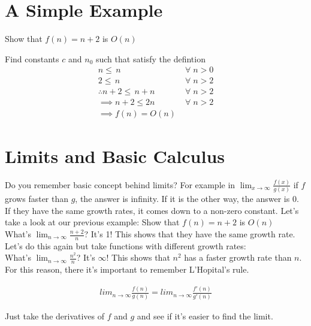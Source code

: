 \documentclass[11pt]{book}
\begin{document}
	\section{A Simple Example}
		Show that $f(n) = n + 2$ is $O(n)$
		\begin{center}
			Find constants $c$ and $n_0$ such that satisfy the defintion \\
			\begin{align*}
				n \leq \, n & \; \forall \; n > 0 \\
				2 \leq \, n & \; \forall \; n > 2 \\
				\therefore n + 2 \leq \, n + n & \; \forall \; n > 2 \\
				\implies n + 2 \leq 2n & \; \forall \; n > 2 \\
				\implies f(n) = O(n) &
			\end{align*}
		\end{center}

	\section{Limits and Basic Calculus}
		Do you remember basic concept behind limits? For example in $\lim_{x \to \infty}
		\frac{f(x)}{g(x)}$ if $f$ grows faster than $g$, the answer is infinity. If it is the other
		way, the answer is 0. If they have the same growth rates, it comes down to a non-zero
		constant. Let's take a look at our previous example: Show that $f(n) = n + 2$ is $O(n)$ \\


		\noindent What's $\lim_{n \to \infty} \frac{n + 2}{n}$? It's 1! This shows that they have
		the same growth rate. Let's do this again but take functions with different growth rates: \\

		\noindent What's $\lim_{n \to \infty} \frac{n^2}{n}$? It's $\infty$! This shows that $n^2$
		has a faster growth rate than $n$. \\

		\noindent For this reason, there it's important to remember L'Hopital's rule.
		\begin{center}
			\begin{align*}
				lim_{n \to \infty}\frac{f(n)}{g(n)} = lim_{n \to \infty}\frac{f'(n)}{g'(n)}
			\end{align*}
		\end{center}

		\noindent Just take the derivatives of $f$ and $g$ and see if it's easier to find the limit. 
		
\end{document}
